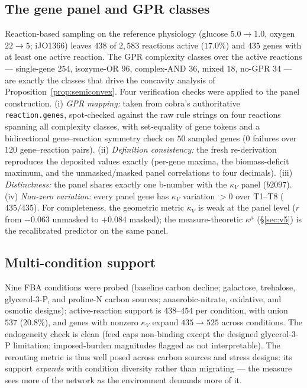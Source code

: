 \documentclass[11pt,a4paper]{article}
\theoremstyle{plain}
\theoremstyle{definition}
\theoremstyle{remark}
\newcommand{\kk}{\kappa_{\!V}}
\newcommand{\kmu}{\kappa^{\mu}}
\begin{document}
\subsection{The gene panel and GPR classes}
\label{sec:e22}
Reaction-based sampling on the reference physiology (glucose $5.0 \to
1.0$, oxygen $22 \to 5$; iJO1366) leaves $438$ of $2{,}583$ reactions
active ($17.0\%$) and $435$ genes with at least one active reaction.
The GPR complexity classes over the active reactions --- single-gene
$254$, isozyme-OR $96$, complex-AND $36$, mixed $18$, no-GPR $34$ ---
are exactly the classes that drive the concavity analysis of
Proposition~\ref{prop:semiconvex}. Four verification checks were
applied to the panel construction. (i) \emph{GPR mapping:} taken from
cobra's authoritative \texttt{reaction.genes}, spot-checked against
the raw rule strings on four reactions spanning all complexity
classes, with set-equality of gene tokens and a bidirectional
gene--reaction symmetry check on $50$ sampled genes ($0$ failures over $120$
gene--reaction pairs). (ii) \emph{Definition consistency:}
the fresh re-derivation reproduces the deposited values exactly
(per-gene maxima, the biomass-deficit maximum, and the
unmasked/masked panel correlations to four decimals). (iii)
\emph{Distinctness:} the panel shares exactly one b-number with the
$\kk$ panel ($b2097$). (iv) \emph{Non-zero variation:} every panel
gene has $\kappa_V$ variation $> 0$ over T1--T8 ($435/435$). For
completeness, the geometric metric $\kk$ is weak at the panel level
($r$ from $-0.063$ unmasked to $+0.084$ masked); the
measure-theoretic $\kmu$ (\S\ref{sec:v5}) is the recalibrated predictor
on the same panel.

\subsection{Multi-condition support}
\label{sec:e23}
Nine FBA conditions were probed (baseline carbon decline; galactose,
trehalose, glycerol-3-P, and proline-N carbon sources;
anaerobic-nitrate, oxidative, and osmotic designs): active-reaction
support is $438$--$454$ per condition, with union $537$ ($20.8\%$),
and genes with nonzero $\kk$ expand $435 \to 525$ across
conditions. The endogeneity check is clean (feed caps non-binding
except the designed glycerol-3-P limitation; imposed-burden
magnitudes flagged as not interpretable). The rerouting metric is
thus well posed across carbon sources and stress designs: its support
\emph{expands} with condition diversity rather than migrating --- the
measure sees more of the network as the environment demands more of
it.
\end{document}
